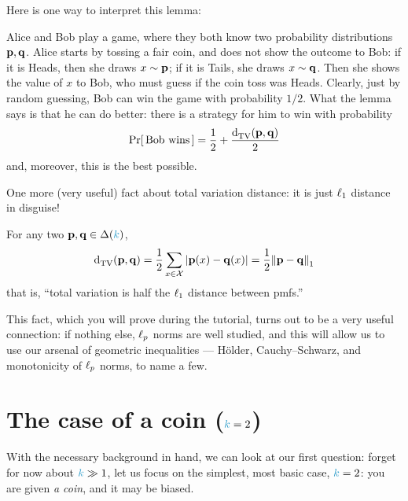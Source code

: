 Here is one way to interpret this lemma: 
\begin{framed}
Alice and Bob play a game, where they both know two probability distributions $\p,\q$. Alice starts by tossing a fair coin, and does not show the outcome to Bob: if it is \textsf{Heads}, then she draws $x\sim \p$; if it is \textsf{Tails}, she draws $x\sim \q$. Then she shows the value of $x$ to Bob, who must guess if the coin toss was \textsf{Heads}.
Clearly, just by random guessing, Bob can win the game with probability $1/2$. What the lemma says is that he can do better: there is a strategy for him to win with probability
\[
    \probaOf{\text{Bob wins}} = \frac{1}{2}+\frac{\totalvardist{\p}{\q}}{2}
\]
and, moreover, this is the best possible.
\end{framed}
One more (very useful) fact about total variation distance: it is just $\lp[1]$ distance in disguise!
\begin{fact}
\label{fact:scheffe}
For any two $\p,\q\in\distribs{\ab}$,
  \begin{equation}
    \label{eq:tv:l1}
    \totalvardist{\p}{\q} = \frac{1}{2}\sum_{x\in\domain} \abs{\p(x)-\q(x)} = \frac{1}{2}\normone{\p-\q}
  \end{equation}
  that is, ``total variation is half the $\lp[1]$ distance between pmfs.''
\end{fact}
This fact, which you will prove during the tutorial, turns out to be a very useful connection: if nothing else, $\lp[p]$ norms are well studied, and this will allow us to use our arsenal of geometric inequalities --- H\"older, Cauchy--Schwarz, and monotonicity of $\lp[p]$ norms, to name a few.

\section{The case of a coin ($\ab=2$)}
With the necessary background in hand, we can look at our first question: forget for now about $\ab \gg 1$, let us focus on the simplest, most basic case, $\ab=2$: you are given \emph{a coin}, and it may be biased.

